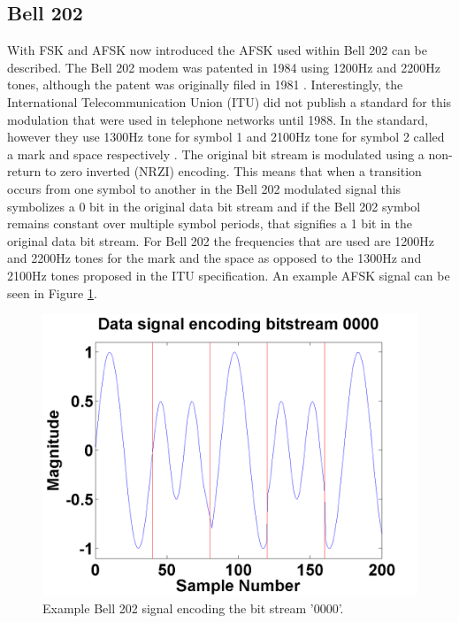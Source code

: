 \subsection{Bell 202}
With FSK and AFSK now introduced the AFSK used within Bell 202 can be described. The Bell 202 modem was patented in 1984 using 1200Hz and 2200Hz tones, although the patent was originally filed in 1981 \cite{stauffer1984fsk}. Interestingly, the International Telecommunication Union (ITU) did not publish a standard for this modulation that were used in telephone networks until 1988. In the standard, however they use 1300Hz tone for symbol 1 and 2100Hz tone for symbol 2 called a mark and space respectively \cite{ITUV23}. The original bit stream is modulated using a non-return to zero inverted (NRZI) encoding. This means that when a transition occurs from one symbol to another in the Bell 202 modulated signal this symbolizes a 0 bit in the original data bit stream and if the Bell 202 symbol remains constant over multiple symbol periods, that signifies a 1 bit in the original data bit stream. For Bell 202 the frequencies that are used are 1200Hz and 2200Hz tones for the mark and the space as opposed to the 1300Hz and 2100Hz tones proposed in the ITU specification. An example AFSK signal can be seen in Figure \ref{exampleBitStream}.
\begin{figure}
  \centering
	\includegraphics[width=0.75\linewidth]{images/Datasignalencodingbitstream0000.png} 
	\caption{Example Bell 202 signal encoding the bit stream '0000'.}
	\label{exampleBitStream}
\end{figure}
